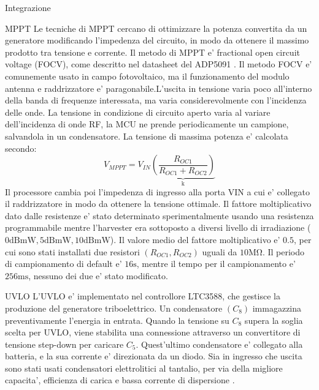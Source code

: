 \begin{section}{Integrazione}
    \begin{subsection}{MPPT}
        Le tecniche di MPPT cercano di ottimizzare la potenza convertita da un generatore modificando l'impedenza del circuito, in modo da ottenere il massimo prodotto tra tensione e corrente. Il metodo di MPPT e' fractional open circuit voltage (FOCV), come descritto nel datasheet del ADP5091 \cite{ADP5091DatasheetProduct}. Il metodo FOCV e' comunemente usato in campo fotovoltaico, ma il funzionamento del modulo antenna e raddrizzatore e' paragonabile.L'uscita in tensione varia poco all'interno della banda di frequenze interessata, ma varia considerevolmente con l'incidenza delle onde. La tensione in condizione di circuito aperto varia al variare dell'incidenza di onde RF, la MCU ne prende periodicamente un campione, salvandola in un condensatore. La tensione di massima potenza e' calcolata secondo:
        \begin{equation*}
            V_{MPPT} = V_{IN}\underbrace{\left(\frac{R_{OC1}}{R_{OC1}+R_{OC2}}\right)}_\mathrm{k}
         \end{equation*}
        Il processore cambia poi l'impedenza di ingresso alla porta VIN a cui e' collegato il raddrizzatore in modo da ottenere la tensione ottimale. Il fattore moltiplicativo dato dalle resistenze e' stato determinato sperimentalmente usando una resistenza programmabile mentre l'harvester era sottoposto a diversi livello di irradiazione (\(0\mathrm{dBmW},5\mathrm{dBmW},10\mathrm{dBmW}\)). Il valore medio del fattore moltiplicativo e' \(0.5\), per cui sono stati installati due resistori \((R_{OC1},R_{OC2})\) uguali da \(10\mathrm{M\Omega}\). Il periodo di campionamento di default e' \(16\mathrm{s}\), mentre il tempo per il campionamento e' \(256\mathrm{ms}\), nessuno dei due e' stato modificato.
    \end{subsection}

    \begin{subsection}{UVLO}
        L'UVLO e' implementato nel controllore LTC3588, che gestisce la produzione del generatore triboelettrico. Un condensatore \((C_8)\) immagazzina preventivamente l'energia in entrata. Quando la tensione su  \(C_8\) supera la soglia scelta per UVLO, viene stabilita una connessione attraverso un convertitore di tensione step-down per caricare \(C_5\). Quest'ultimo condensatore e' collegato alla batteria, e la sua corrente e' direzionata da un diodo. Sia in ingresso che uscita sono stati usati condensatori elettrolitici al tantalio, per via della migliore capacita', efficienza di carica e bassa corrente di dispersione \cite{torkiElectrolyticCapacitorProperties2023}.
    \end{subsection}


\end{section}
